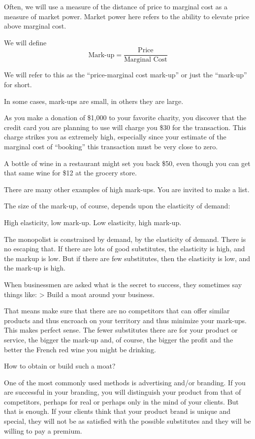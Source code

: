 \documentclass[
]{book}
\begin{document}
Often, we will use a measure of the distance of price to marginal cost as a measure of market power. Market power here refers to the ability to elevate price above marginal cost.

We will define
\[\text{Mark-up}  =  \frac{\text{Price}}{\text{Marginal Cost}}\]

We will refer to this as the ``price-marginal cost mark-up'' or just the ``mark-up'' for short.

In some cases, mark-ups are small, in others they are large.

As you make a donation of \$1,000 to your favorite charity, you discover that the credit card you are planning to use will charge you \$30 for the transaction. This charge strikes you as extremely high, especially since your estimate of the marginal cost of ``booking'' this transaction must be very close to zero.

A bottle of wine in a restaurant might set you back \$50, even though you can get that same wine for \$12 at the grocery store.

There are many other examples of high mark-ups. You are invited to make a list.

The size of the mark-up, of course, depends upon the elasticity of demand:

\begin{center}
High elasticity, low mark-up.
Low elasticity, high mark-up.

\end{center}

The monopolist is constrained by demand, by the elasticity of demand. There is no escaping that. If there are lots of good substitutes, the elasticity is high, and the markup is low. But if there are few substitutes, then the elasticity is low, and the mark-up is high.

When businessmen are asked what is the secret to success, they sometimes say things like:
\textgreater{} Build a moat around your business.

That means make sure that there are no competitors that can offer similar products and thus encroach on your territory and thus minimize your mark-ups. This makes perfect sense. The fewer substitutes there are for your product or service, the bigger the mark-up and, of course, the bigger the profit and the better the French red wine you might be drinking.

How to obtain or build such a moat?

One of the most commonly used methods is advertising and/or branding. If you are successful in your branding, you will distinguish your product from that of competitors, perhaps for real or perhaps only in the mind of your clients. But that is enough. If your clients think that your product brand is unique and special, they will not be as satisfied with the possible substitutes and they will be willing to pay a premium.
\end{document}
